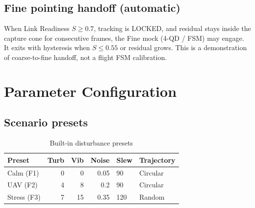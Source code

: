 \documentclass[11pt,a4paper]{article}
\begin{document}
\subsection{Fine pointing handoff (automatic)}
When Link Readiness $S\ge0.7$, tracking is LOCKED, and residual stays inside the capture cone for consecutive frames, the Fine mock (4-QD / FSM) may engage.
It exits with hysteresis when $S\le0.55$ or residual grows.
This is a demonstration of coarse-to-fine handoff, not a flight FSM calibration.

\section{Parameter Configuration}

\subsection{Scenario presets}
\begin{table}[H]
\centering
\caption{Built-in disturbance presets}
\label{tab:scenarios}
\small
\begin{tabular}{@{}lrrrll@{}}
\toprule
Preset & Turb & Vib & Noise & Slew & Trajectory \\
\midrule
Calm (F1) & 0 & 0 & 0.05 & 90 & Circular \\
UAV (F2) & 4 & 8 & 0.2 & 90 & Circular \\
Stress (F3) & 7 & 15 & 0.35 & 120 & Random \\
\bottomrule
\end{tabular}
\end{table}
\end{document}
